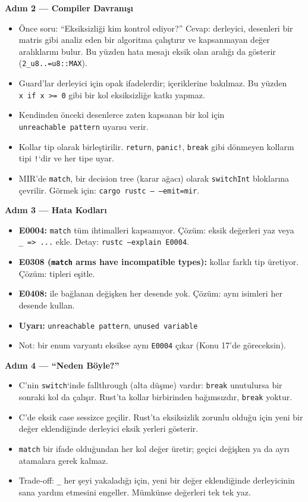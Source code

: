 \documentclass[12pt,a4paper]{article}
\begin{document}
\textbf{Adım 2 --- Compiler Davranışı}

\begin{itemize}
\tightlist
\item
  Önce soru: ``Eksiksizliği kim kontrol ediyor?'' Cevap: derleyici, desenleri bir matris gibi analiz eden bir algoritma çalıştırır ve kapsanmayan değer aralıklarını bulur. Bu yüzden hata mesajı eksik olan aralığı da gösterir (\texttt{2\_u8..=u8::MAX}).
\item
  Guard'lar derleyici için opak ifadelerdir; içeriklerine bakılmaz. Bu yüzden \texttt{x\ if\ x\ \textgreater{}=\ 0} gibi bir kol eksiksizliğe katkı yapmaz.
\item
  Kendinden önceki desenlerce zaten kapsanan bir kol için \texttt{unreachable\ pattern} uyarısı verir.
\item
  Kollar tip olarak birleştirilir. \texttt{return}, \texttt{panic!}, \texttt{break} gibi dönmeyen kolların tipi \texttt{!}`dir ve her tipe uyar.
\item
  MIR'de \texttt{match}, bir decision tree (karar ağacı) olarak \texttt{switchInt} bloklarına çevrilir. Görmek için: \texttt{cargo\ rustc\ --\ --emit=mir}.
\end{itemize}

\textbf{Adım 3 --- Hata Kodları}

\begin{itemize}
\tightlist
\item
  \textbf{E0004:} \texttt{match} tüm ihtimalleri kapsamıyor. Çözüm: eksik değerleri yaz veya \texttt{\_\ =\textgreater{}\ ...} ekle. Detay: \texttt{rustc\ --explain\ E0004}.
\item
  \textbf{E0308 (\texttt{match} arms have incompatible types):} kollar farklı tip üretiyor. Çözüm: tipleri eşitle.
\item
  \textbf{E0408:} \texttt{\textbar{}} ile bağlanan değişken her desende yok. Çözüm: aynı isimleri her desende kullan.
\item
  \textbf{Uyarı:} \texttt{unreachable\ pattern}, \texttt{unused\ variable}
\item
  Not: bir enum varyantı eksikse aynı \texttt{E0004} çıkar (Konu 17'de göreceksin).
\end{itemize}

\textbf{Adım 4 --- ``Neden Böyle?''}

\begin{itemize}
\tightlist
\item
  C'nin \texttt{switch}`inde fallthrough (alta düşme) vardır: \texttt{break} unutulursa bir sonraki kol da çalışır. Rust'ta kollar birbirinden bağımsızdır, \texttt{break} yoktur.
\item
  C'de eksik case sessizce geçilir. Rust'ta eksiksizlik zorunlu olduğu için yeni bir değer eklendiğinde derleyici eksik yerleri gösterir.
\item
  \texttt{match} bir ifade olduğundan her kol değer üretir; geçici değişken ya da ayrı atamalara gerek kalmaz.
\item
  Trade-off: \texttt{\_} her şeyi yakaladığı için, yeni bir değer eklendiğinde derleyicinin sana yardım etmesini engeller. Mümkünse değerleri tek tek yaz.
\end{itemize}
\end{document}
